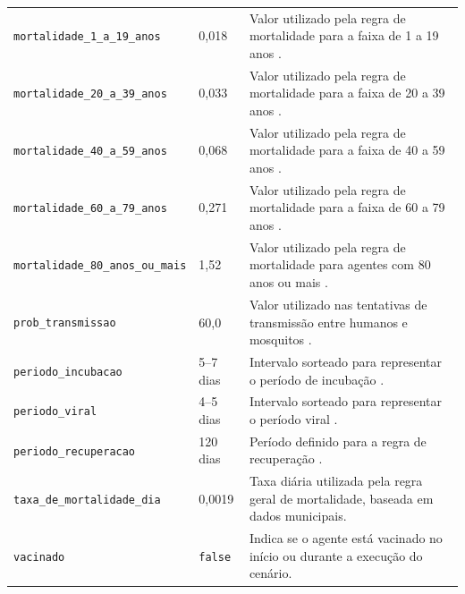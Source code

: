 \begin{table}[htb]
\begin{tabular}{p{4.0cm} p{2.5cm} p{5.9cm}}
        \texttt{mortalidade\_1\_a\_19\_anos}
        & 0,018
        & Valor utilizado pela regra de mortalidade para a faixa de 1 a 19 anos \cite{souza_letalidade_dengue_2025}. \\

        \texttt{mortalidade\_20\_a\_39\_anos}
        & 0,033
        & Valor utilizado pela regra de mortalidade para a faixa de 20 a 39 anos \cite{souza_letalidade_dengue_2025}. \\

        \texttt{mortalidade\_40\_a\_59\_anos}
        & 0,068
        & Valor utilizado pela regra de mortalidade para a faixa de 40 a 59 anos \cite{souza_letalidade_dengue_2025}. \\

        \texttt{mortalidade\_60\_a\_79\_anos}
        & 0,271
        & Valor utilizado pela regra de mortalidade para a faixa de 60 a 79 anos \cite{souza_letalidade_dengue_2025}. \\

        \texttt{mortalidade\_80\_anos\_ou\_mais}
        & 1,52
        & Valor utilizado pela regra de mortalidade para agentes com 80 anos ou mais \cite{souza_letalidade_dengue_2025}. \\

        \texttt{prob\_transmissao}
        & 60,0
        & Valor utilizado nas tentativas de transmissão entre humanos e mosquitos \cite{jindal_rao_2017}. \\

        \texttt{periodo\_incubacao}
        & 5--7 dias
        & Intervalo sorteado para representar o período de incubação \cite{periodo_incubacao_dengue}. \\

        \texttt{periodo\_viral}
        & 4--5 dias
        & Intervalo sorteado para representar o período viral \cite{periodo_incubacao_dengue}. \\

        \texttt{periodo\_recuperacao}
        & 120 dias
        & Período definido para a regra de recuperação \cite{periodo_recuperacao_dengue}. \\

        \texttt{taxa\_de\_mortalidade\_dia}
        & 0,0019
        & Taxa diária utilizada pela regra geral de mortalidade, baseada em dados municipais. \\

        \texttt{vacinado}
        & \texttt{false}
        & Indica se o agente está vacinado no início ou durante a execução do cenário. \\

        \hline
    \end{tabular}
\end{table}

